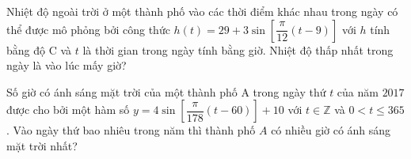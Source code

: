 \begin{ex}%
	Nhiệt độ ngoài trời ở một thành phố vào các thời điểm khác nhau trong ngày có thể được mô phỏng bởi công thức $h(t)=29+3\sin \left[\dfrac{\pi}{12}(t-9)\right]$ với $h$ tính bằng  độ $\mathrm{C}$ và $t$ là thời gian trong ngày tính bằng giờ. Nhiệt độ thấp nhất trong ngày là vào lúc mấy giờ?
\end{ex}

\begin{ex}%
	Số giờ có ánh sáng mặt trời  của một thành phố A trong ngày thứ $t$ của năm $2017$ được cho bởi một hàm số $y=4\sin \left[\dfrac{\pi}{178}\left(t-60\right)\right]+10$ với $t\in \mathbb{Z}$ và $0<t\le 365$. Vào ngày thứ bao nhiêu trong năm thì thành phố $A$ có nhiều giờ có ánh sáng mặt trời nhất?
\end{ex}

